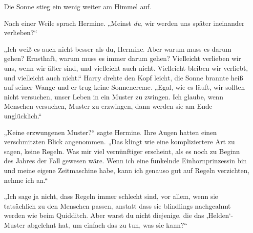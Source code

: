 Die Sonne stieg ein wenig weiter am Himmel auf.

Nach einer Weile sprach Hermine.
„Meinst \emph{du}, wir werden uns später ineinander verlieben?“

„Ich weiß es auch nicht besser als du, Hermine. Aber warum muss es darum gehen? Ernsthaft, warum muss es immer darum gehen? Vielleicht verlieben wir uns, wenn wir älter sind, und vielleicht auch nicht. Vielleicht bleiben wir verliebt, und vielleicht auch nicht.“
Harry drehte den Kopf leicht, die Sonne brannte heiß auf seiner Wange und er trug keine Sonnencreme.
„Egal, wie es läuft, wir sollten nicht versuchen, unser Leben in ein Muster zu zwingen. Ich glaube, wenn Menschen versuchen, Muster zu erzwingen, dann werden sie am Ende unglücklich.“

„Keine erzwungenen Muster?“ sagte Hermine.
Ihre Augen hatten einen verschmitzten Blick angenommen.
„Das klingt wie eine kompliziertere Art zu sagen, keine Regeln. Was mir viel vernünftiger erscheint, als es noch zu Beginn des Jahres der Fall gewesen wäre. Wenn ich eine funkelnde Einhornprinzessin bin und meine eigene Zeitmaschine habe, kann ich genauso gut auf Regeln verzichten, nehme ich an.“

„Ich sage ja nicht, dass Regeln immer schlecht sind, vor allem, wenn sie tatsächlich zu den Menschen passen, anstatt dass sie blindlings nachgeahmt werden wie beim Quidditch. Aber warst du nicht diejenige, die das ‚Helden‘-Muster abgelehnt hat, um einfach das zu tun, was sie kann?“

